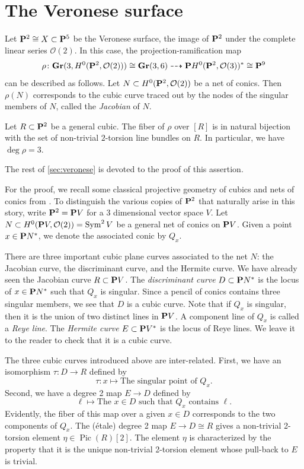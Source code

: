 \documentclass{amsart}
\renewcommand {\P}{{\bf P}}
\providecommand {\Gr}{{\bf Gr}}
\providecommand {\from}{{\colon}}
\providecommand{\Pic}{\operatorname{Pic}}
\providecommand{\Sym}{\operatorname{Sym}}
\numberwithin{equation}{section}
\renewcommand{\O}{\mathcal O}
\begin{document}
\section{The Veronese surface} %
\label{sec:veronese}
Let $\P^{2} \cong X \subset \P^{5}$ be the Veronese surface, the image of $\P^2$ under the complete linear series $\O(2)$.
In this case, the projection-ramification map
\begin{align*}
  \rho \from  \Gr(3,H^0(\P^2, \O(2))) \cong \Gr(3, 6) \dashrightarrow \P H^0(\P^2, \O(3))^* \cong \P^9
\end{align*}
can be described as follows.
Let $N \subset H^0(\P^2, \O(2))$ be a net of conics.
Then $\rho(N)$ corresponds to the cubic curve traced out by the nodes of the singular members of $N$, called the \emph{Jacobian} of $N$.
\begin{proposition}\label{prop:veronese}
  Let $R \subset \P^2$ be a general cubic.
  The fiber of $\rho$ over $[R]$ is in natural bijection with the set of non-trivial $2$-torsion line bundles on $R$.
  In particular, we have $\deg \rho = 3$.
\end{proposition}
The rest of \autoref{sec:veronese} is devoted to the proof of this assertion.

For the proof, we recall some classical projective geometry of cubics and nets of conics from \cite[\S~3]{dol:12}.
To distinguish the various copies of $\P^2$ that naturally arise in this story, write $\P^2 = \P V$ for a 3 dimensional vector space $V$.
Let $N \subset H^0(\P V, \O(2)) = \Sym^2V$ be a general net of conics on $\P V$.
Given a point $x \in \P N^*$, we denote the associated conic by $Q_x$.

There are three important cubic plane curves associated to the net $N$: the Jacobian curve, the discriminant curve, and the Hermite curve.
We have already seen the Jacobian curve $R \subset \P V$.
The \emph{discriminant curve} $D \subset \P N^*$ is the locus of $x \in \P N^*$ such that $Q_x$ is singular.
Since a pencil of conics contains three singular members, we see that $D$ is a cubic curve.
Note that if $Q_x$ is singular, then it is the union of two distinct lines in $\P V$.
A component line of $Q_x$ is called a \emph{Reye line}.
The \emph{Hermite curve} $E \subset \P V^*$ is the locus of Reye lines.
We leave it to the reader to check that it is a cubic curve.

The three cubic curves introduced above are inter-related.
First, we have an isomorphism $\tau \from D \to R$ defined by
\begin{equation}\label{eqn:DR}
  \tau \from x \mapsto \text{The singular point of $Q_x$}.
\end{equation}
Second, we have a degree 2 map $E \to D$ defined by
\[ \ell \mapsto \text{The $x \in D$ such that $Q_x$ contains $\ell$}.\]
Evidently, the fiber of this map over a given $x \in D$ corresponds to the two components of $Q_x$.
The (\'etale) degree 2 map $E \to D \cong R$ gives a non-trivial 2-torsion element $\eta \in \Pic(R)[2]$.
The element $\eta$ is characterized by the property that it is the unique non-trivial 2-torsion element whose pull-back to $E$ is trivial.
\end{document}
